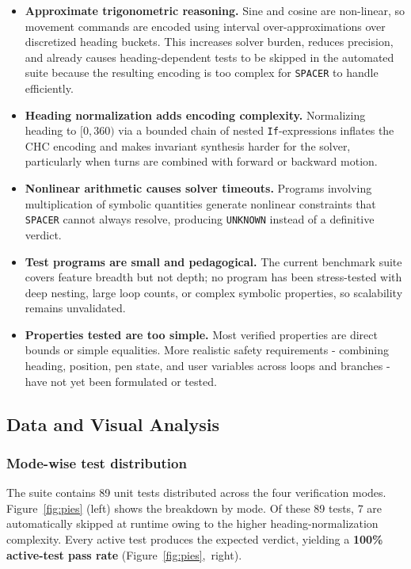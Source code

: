 \begin{itemize}[leftmargin=1.5em]
    \item \textbf{Approximate trigonometric reasoning.} Sine and cosine are non-linear, so movement commands are encoded using interval over-approximations over discretized heading buckets. This increases solver burden, reduces precision, and already causes heading-dependent tests to be skipped in the automated suite because the resulting encoding is too complex for \texttt{SPACER} to handle efficiently.
    \item \textbf{Heading normalization adds encoding complexity.} Normalizing heading to $[0, 360)$ via a bounded chain of nested \texttt{If}-expressions inflates the CHC encoding and makes invariant synthesis harder for the solver, particularly when turns are combined with forward or backward motion.
    \item \textbf{Nonlinear arithmetic causes solver timeouts.} Programs involving multiplication of symbolic quantities generate nonlinear constraints that \texttt{SPACER} cannot always resolve, producing \texttt{UNKNOWN} instead of a definitive verdict.
    \item \textbf{Test programs are small and pedagogical.} The current benchmark suite covers feature breadth but not depth; no program has been stress-tested with deep nesting, large loop counts, or complex symbolic properties, so scalability remains unvalidated.
    \item \textbf{Properties tested are too simple.} Most verified properties are direct bounds or simple equalities. More realistic safety requirements - combining heading, position, pen state, and user variables across loops and branches - have not yet been formulated or tested.
\end{itemize}

\subsection*{Data and Visual Analysis}

\subsubsection*{Mode-wise test distribution}

The suite contains 89 unit tests distributed across the four verification modes.
Figure~\ref{fig:pies} (left) shows the breakdown by mode.
Of these 89 tests, 7 are automatically skipped at runtime owing to the
higher heading-normalization complexity. Every active test produces the expected
verdict, yielding a \textbf{100\% active-test pass rate} (Figure~\ref{fig:pies},~right).

